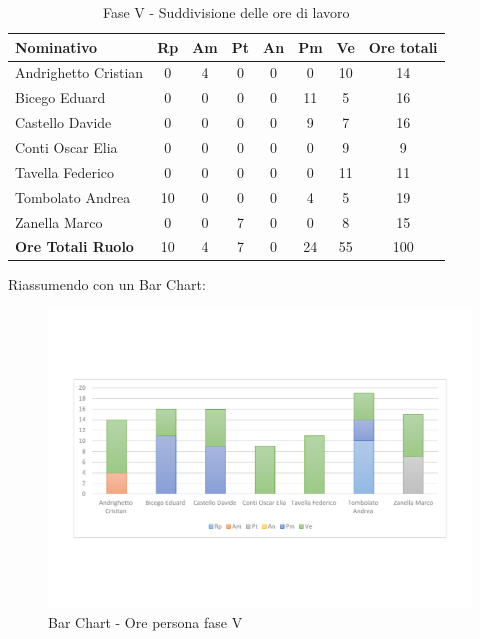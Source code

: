 \documentclass[../PianoProgetto.tex]{subfiles}
\begin{document}
	\begin{table}[h]
		\begin{tabularx}{\textwidth}{l  * {6}{C}  c}
			\toprule
			\textbf{Nominativo} & \textbf{Rp} & \textbf{Am} & \textbf{Pt} 
						& \textbf{An} & \textbf{Pm} & \textbf{Ve} & \textbf{Ore totali} \\
			\midrule
			Andrighetto Cristian & 0 & 4 & 0 & 0 & 0 & 10 & 14 \\
			Bicego Eduard & 0 & 0 &	0 &	0 &	11 & 5 & 16 \\
			Castello Davide & 0 & 0 & 0 & 0 & 9 & 7 & 16 \\
			Conti Oscar Elia &0 & 0 & 0 & 0 & 0 & 9 & 9 \\
			Tavella Federico &	0 & 0 & 0 & 0 & 0 & 11 & 11 \\
			Tombolato Andrea & 10 & 0 & 0 & 0 & 4 & 5 & 19 \\
			Zanella Marco & 0 & 0 & 7 & 0 & 0 & 8 & 15 \\
			\midrule			
			\textbf{Ore Totali Ruolo} & 10 & 4 &	7 &	0 &	24 & 55 & 100 \\
			\bottomrule
		\end{tabularx}
		\caption{Fase V - Suddivisione delle ore di lavoro}
		\label{tab:faseV_ore}
	\end{table}
\vfill	
	Riassumendo con un Bar Chart:
	
	\begin{figure}[!h]
		\centering
		\includegraphics[width=\textwidth , trim=2cm 5cm 2cm 5cm]{grafici/V/V-ore-persona}
			\caption{Bar Chart - Ore persona fase V}
		\label{fig:BarChart-faseV_ore}
	\end{figure}
\vfill	
\newpage
\vfill
\end{document}
